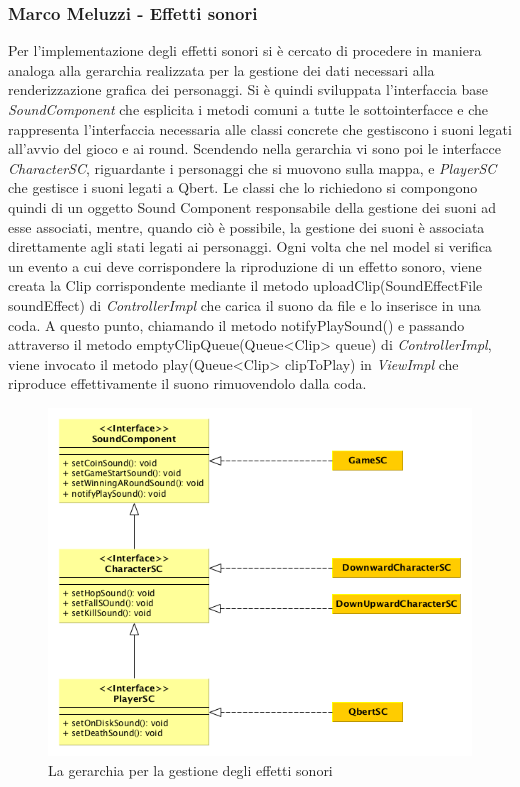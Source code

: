 \documentclass[a4paper,12pt, hidelinks]{report}
\begin{document}
\begin{flushright}
\item\subsubsection{Marco Meluzzi - Effetti sonori}
\end{flushright}

Per l'implementazione degli effetti sonori si è cercato di procedere in maniera analoga alla gerarchia realizzata per la gestione dei dati necessari alla renderizzazione grafica dei personaggi. Si è quindi sviluppata l'interfaccia base \emph{SoundComponent} che esplicita i metodi comuni a tutte le sottointerfacce e che rappresenta l'interfaccia necessaria alle classi concrete che gestiscono i suoni legati all'avvio del gioco e ai round. Scendendo nella gerarchia vi sono poi le interfacce \emph{CharacterSC}, riguardante i personaggi che si muovono sulla mappa, e \emph{PlayerSC} che gestisce i suoni legati a Qbert. Le classi che lo richiedono si compongono quindi di un oggetto Sound Component responsabile della gestione dei suoni ad esse associati, mentre, quando ciò è possibile, la gestione dei suoni è associata direttamente agli stati legati ai personaggi. Ogni volta che nel model si verifica un evento a cui deve corrispondere la riproduzione di un effetto sonoro, viene creata la Clip corrispondente mediante il metodo uploadClip(SoundEffectFile soundEffect) di \emph{ControllerImpl} che carica il suono da file e lo inserisce in una coda. A questo punto, chiamando il metodo notifyPlaySound() e passando attraverso il metodo emptyClipQueue(Queue<Clip> queue) di \emph{ControllerImpl}, viene invocato il metodo play(Queue<Clip> clipToPlay) in \emph{ViewImpl} che riproduce effettivamente il suono rimuovendolo dalla coda.

\begin{figure}[H]
\centering{}
\includegraphics[width=\linewidth]{img/GerarchiaSound}
\caption{La gerarchia per la gestione degli effetti sonori}
\label{img:GerarchiaSound}
\end{figure}
\end{document}
